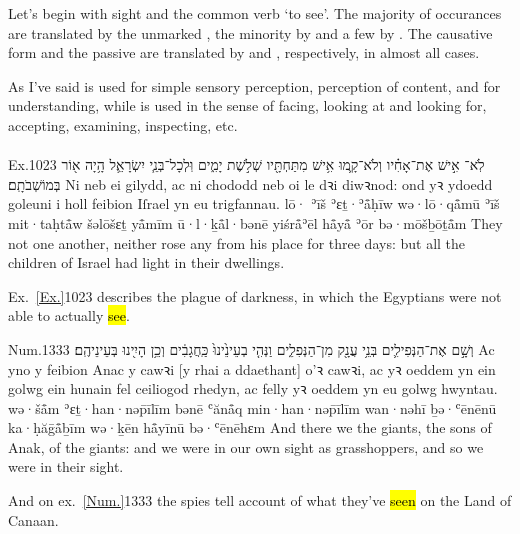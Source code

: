 \begin{paper}
	{\click} Let’s begin with sight and the common verb  ‘to see’. The majority of occurances are translated by the unmarked , the minority by  and a few by . The causative form  and the passive  are translated by  and , respectively, in almost all cases.

	As I’ve said  is used for simple sensory perception, perception of content, and for understanding, while  is used in the sense of facing, looking at and looking for, accepting, examining, inspecting, etc.
\end{paper}



\paragraph{}


\begin{example}{Ex.}{10}{23}{}{}
	\quoling
	{לֹֽא־ אִ֣ישׁ אֶת־אָחִ֗יו וְלֹא־קָ֛מוּ אִ֥ישׁ מִתַּחְתָּ֖יו שְׁלֹ֣שֶׁת יָמִ֑ים וּֽלְכָל־בְּנֵ֧י יִשְׂרָאֵ֛ל הָ֥יָה א֖וֹר בְּמוֹשְׁבֹתָֽם׃}
	{Ni  neb ei gilydd, ac ni chododd neb oi le dꝛi diwꝛnod: ond yꝛ ydoedd goleuni i holl feibion Iſrael yn eu trigfannau.}
	{lō· ʾīš ʾɛṯ·ʾå̄ḥīw wə·lō·qå̄mū ʾīš mit·taḥtå̄w šəlōšɛṯ yå̄mīm ū·l·ḵå̄l·bənē yiśrå̄ʾēl hå̄yå̄ ʾōr bə·mōšḇōṯå̄m}
	{They  not one another, neither rose any from his place for three days: but all the children of Israel had light in their dwellings.}
\end{example}
\begin{paper}
	\explain Ex.~\vref{Ex.}{10}{23}{} describes the plague of darkness, in which the Egyptians were not able to actually \hl{see}.
\end{paper}

\begin{example}{Num.}{13}{33}{}{}
	\quoling
	{וְשָׁ֣ם  אֶת־הַנְּפִילִ֛ים בְּנֵ֥י עֲנָ֖ק מִן־הַנְּפִלִ֑ים וַנְּהִ֤י בְעֵינֵ֙ינוּ֙ כַּֽחֲגָבִ֔ים וְכֵ֥ן הָיִ֖ינוּ בְּעֵינֵיהֶֽם׃}
	{Ac yno y  feibion Anac y cawꝛi [y rhai a ddaethant] o’ꝛ cawꝛi, ac yꝛ oeddem yn ein golwg ein hunain fel ceiliogod rhedyn, ac felly yꝛ oeddem yn eu golwg hwyntau.}
	{wə·šå̄m  ʾɛṯ·han·nəp̄īlīm bənē ʿănå̄q min·han·nəp̄īlīm wan·nəhī ḇə·ʿēnēnū ka·ḥăḡå̄ḇīm wə·ḵēn hå̄yīnū bə·ʿēnēhɛm}
	{And there we  the giants, the sons of Anak,  of the giants: and we were in our own sight as grasshoppers, and so we were in their sight.}
\end{example}
\begin{paper}
	\explain And on ex.~\vref{Num.}{13}{33}{} the spies tell account of what they’ve \hl{seen} on the Land of Canaan.
\end{paper}



